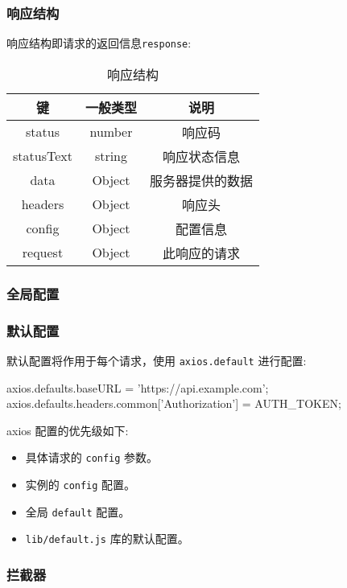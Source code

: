 \subsubsection*{响应结构}

响应结构即请求的返回信息\texttt{response}:

\begin{table}[H]
  \small
  \centering
  \caption{响应结构}
  \label{table:响应结构}
  \setlength{\tabcolsep}{4mm}
  \begin{tabular}{c|cc}
    \toprule
    \textbf{键} & \textbf{一般类型} & \textbf{说明} \\
    \midrule
    status & number & 响应码 \\
    statusText & string & 响应状态信息 \\
    data & Object & 服务器提供的数据 \\
    headers & Object & 响应头 \\
    config & Object & 配置信息 \\
    request & Object & 此响应的请求 \\
    \bottomrule
  \end{tabular}
\end{table}

\subsubsection{全局配置}

\subsubsection*{默认配置}

默认配置将作用于每个请求，使用 \texttt{axios.default} 进行配置:
\begin{JavaScript}
axios.defaults.baseURL = 'https://api.example.com';
axios.defaults.headers.common['Authorization'] = AUTH_TOKEN;
\end{JavaScript}

axios 配置的优先级如下:
\begin{itemize}
  \item 具体请求的 \texttt{config} 参数。
  \item 实例的 \texttt{config} 配置。
  \item 全局 \texttt{default} 配置。
  \item \texttt{lib/default.js} 库的默认配置。
\end{itemize}

\subsubsection*{拦截器}

